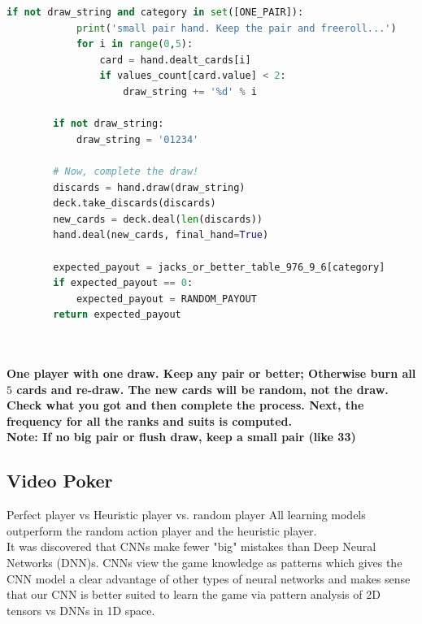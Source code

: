 \documentclass[review]{elsarticle}
\begin{document}
\begin{lstlisting}[language=Python, caption=VP]
        if not draw_string and category in set([ONE_PAIR]):
            print('small pair hand. Keep the pair and freeroll...')
            for i in range(0,5):
                card = hand.dealt_cards[i]
                if values_count[card.value] < 2:
                    draw_string += '%d' % i
            
        if not draw_string:
            draw_string = '01234'

        # Now, complete the draw!
        discards = hand.draw(draw_string)
        deck.take_discards(discards)
        new_cards = deck.deal(len(discards))
        hand.deal(new_cards, final_hand=True)

        expected_payout = jacks_or_better_table_976_9_6[category]
        if expected_payout == 0:
            expected_payout = RANDOM_PAYOUT
        return expected_payout
\end{lstlisting} 
~\cite{moscow25} \\

\paragraph{
One player with one draw. Keep any pair or better; Otherwise burn all $5$ cards and 
re-draw. The new cards will be random, not the draw. Check what you got and then complete
the process. Next, the frequency for all the ranks and suits is computed.\\
\textbf{Note:} If no big pair or flush draw, keep a small pair (like 33) }



\subsection{Video Poker}

Perfect player vs Heuristic player vs. random player
All learning models outperform the random action player and
the heuristic player.\\
It was discovered that CNNs make fewer {\ttfamily"}big{\ttfamily"} mistakes 
than Deep Neural Networks (DNN)s. CNNs view the game knowledge as patterns
which gives the CNN model a clear advantage of other types of neural networks and makes 
sense that our CNN is better suited to learn the game via pattern analysis
of 2D tensors vs DNNs in 1D space.
\end{document}
